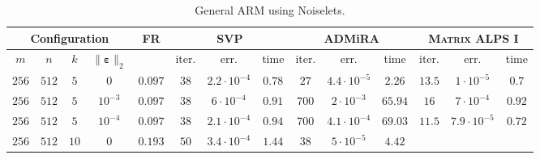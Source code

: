 \documentclass[twocolumn]{svjour3}
\newcommand{\vectornormbig}[1]{\big\|#1\big\|}
\newcommand{\noise}{\boldsymbol{\varepsilon}}
\newcommand{\rank}{k}
\begin{document}
\begin{table*}
\caption{General ARM using Noiselets.} {\label{table:1}}
\begin{center}
\begin{tabular}{|c|c|c|c|c|c|c|c|c|c|c|c|c|c}
\multicolumn{4}{c|}{Configuration} & FR & \multicolumn{3}{|c|}{SVP} & \multicolumn{3}{|c|}{ADMiRA} & \multicolumn{3}{|c}{\textsc{Matrix ALPS I}} \\
\hline \hline
\multicolumn{1}{c}{$m$}  & \multicolumn{1}{c}{$n$} & \multicolumn{1}{c}{$\rank$} & \multicolumn{1}{c|}{$\vectornormbig{\noise}_2$} & & 
\multicolumn{1}{|c}{\rm{iter.}} & \multicolumn{1}{c}{\rm{err.}} & \multicolumn{1}{c|}{\rm{time}} &
\multicolumn{1}{|c}{\rm{iter.}} & \multicolumn{1}{c}{\rm{err.}} & \multicolumn{1}{c|}{\rm{time}} &
\multicolumn{1}{|c}{\rm{iter.}} & \multicolumn{1}{c}{\rm{err.}} & \multicolumn{1}{c}{\rm{time}} \\
\hline\hline
\multicolumn{1}{c}{$256$} & \multicolumn{1}{c}{$512$} & \multicolumn{1}{c}{$5$} & \multicolumn{1}{c|}{$0$} & $ 0.097 $ & 
\multicolumn{1}{|c}{$38$} & \multicolumn{1}{c}{$2.2\cdot 10^{-4}$} & \multicolumn{1}{c|}{$0.78$} &
\multicolumn{1}{|c}{$27$} & \multicolumn{1}{c}{$4.4\cdot 10^{-5}$} & \multicolumn{1}{c|}{$2.26$} &
\multicolumn{1}{|c}{$13.5$} & \multicolumn{1}{c}{$1\cdot 10^{-5}$} & \multicolumn{1}{c}{$0.7$} \\
\hline
\multicolumn{1}{c}{$256$} & \multicolumn{1}{c}{$512$} & \multicolumn{1}{c}{$5$} & \multicolumn{1}{c|}{$10^{-3}$} & $ 0.097 $ & 
\multicolumn{1}{|c}{$38$} & \multicolumn{1}{c}{$6\cdot 10^{-4}$} & \multicolumn{1}{c|}{$0.91$} &
\multicolumn{1}{|c}{$700$} & \multicolumn{1}{c}{$2\cdot 10^{-3}$} & \multicolumn{1}{c|}{$65.94$} &
\multicolumn{1}{|c}{$16$} & \multicolumn{1}{c}{$7\cdot 10^{-4}$} & \multicolumn{1}{c}{$0.92$} \\
\hline
\multicolumn{1}{c}{$256$} & \multicolumn{1}{c}{$512$} & \multicolumn{1}{c}{$5$} & \multicolumn{1}{c|}{$10^{-4}$} & $ 0.097 $ & 
\multicolumn{1}{|c}{$38$} & \multicolumn{1}{c}{$2.1\cdot 10^{-4}$} & \multicolumn{1}{c|}{$0.94$} &
\multicolumn{1}{|c}{$700$} & \multicolumn{1}{c}{$4.1\cdot 10^{-4}$} & \multicolumn{1}{c|}{$69.03$} &
\multicolumn{1}{|c}{$11.5$} & \multicolumn{1}{c}{$7.9\cdot 10^{-5}$} & \multicolumn{1}{c}{$0.72$} \\
\hline
\multicolumn{1}{c}{$256$} & \multicolumn{1}{c}{$512$} & \multicolumn{1}{c}{$10$} & \multicolumn{1}{c|}{$0$} & $ 0.193 $ & 
\multicolumn{1}{|c}{$50$} & \multicolumn{1}{c}{$3.4\cdot 10^{-4}$} & \multicolumn{1}{c|}{$1.44$} &
\multicolumn{1}{|c}{$38$} & \multicolumn{1}{c}{$5\cdot 10^{-5}$} & \multicolumn{1}{c|}{$4.42$} &

\end{tabular}
\end{center}
\end{table*}
\end{document}
